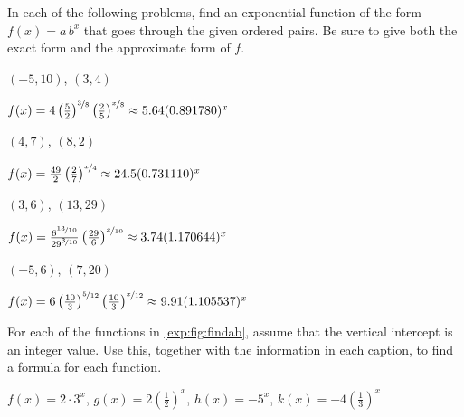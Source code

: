 \begin{exercises}
			
			
\begin{problem}
In each of the following problems, find an exponential function of the form $f(x)=a\,b^x$ that 
goes through the given ordered pairs. Be sure to give both the exact form and the approximate form of $f$.
\begin{multicols}{2}
	\begin{subproblem}
		$(-5,10)$, $(3,4)$
		\begin{shortsolution}
			$f(x)=4\left(\frac{5}{2}\right)^{\nicefrac{3}{8}}\left(\frac{2}{5}\right)^{\nicefrac{x}{8}}\approx 5.64(0.891780)^x$
		\end{shortsolution}
	\end{subproblem}
	\begin{subproblem}
		$(4,7)$, $(8,2)$
		\begin{shortsolution}
			$f(x)=\frac{49}{2}\left(\frac{2}{7}\right)^{\nicefrac{x}{4}}\approx 24.5(0.731110)^x$
		\end{shortsolution}
	\end{subproblem}
	\begin{subproblem}
		$(3,6)$, $(13,29)$
		\begin{shortsolution}
			$f(x)=\frac{6^{\nicefrac{13}{10}}}{29^{\nicefrac{3}{10}}}\left(\frac{29}{6}\right)^{\nicefrac{x}{10}}\approx 3.74 (1.170644)^x$
		\end{shortsolution}
	\end{subproblem}
	\begin{subproblem}
		$(-5,6)$, $(7,20)$
		\begin{shortsolution}
			$f(x)=6\left(\frac{10}{3}\right)^{\nicefrac{5}{12}}\left(\frac{10}{3}\right)^{\nicefrac{x}{12}}\approx 9.91 (1.105537)^x$
		\end{shortsolution}
	\end{subproblem}
\end{multicols}
\end{problem}
			
			
\begin{problem}
For each of the functions in \cref{exp:fig:findab}, assume that 
the vertical intercept is an integer value. Use this, together with 
the information in each caption, to find a formula for each function.
\begin{shortsolution}
	$f(x)=2\cdot 3^x$, $g(x)=2\left( \frac{1}{2} \right)^x$, $h(x)=-5^x$, $k(x)=-4\left( \frac{1}{3} \right)^x$  
\end{shortsolution}
\end{problem}
			

\end{exercises}
